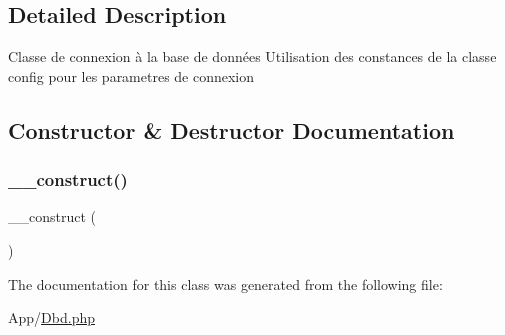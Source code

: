 \subsection{Detailed Description}
Classe de connexion à la base de données Utilisation des constances de la classe config pour les parametres de connexion 

\subsection{Constructor \& Destructor Documentation}
\mbox{\label{class_app_1_1_dbd_a095c5d389db211932136b53f25f39685}} 
\subsubsection{\texorpdfstring{\+\_\+\+\_\+construct()}{\_\_construct()}}
{\footnotesize\ttfamily \+\_\+\+\_\+construct (\begin{DoxyParamCaption}{ }\end{DoxyParamCaption})}



The documentation for this class was generated from the following file\+:\begin{DoxyCompactItemize}
\item 
App/\hyperlink{_dbd_8php}{Dbd.\+php}\end{DoxyCompactItemize}
